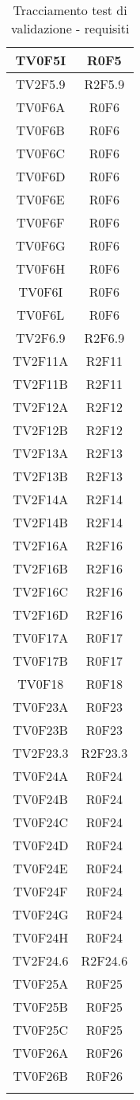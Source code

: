 \begin{longtable}{|c|c|}
	\hline
	TV0F5I & R0F5\\
	\hline
	TV2F5.9 & R2F5.9\\
	\hline
	TV0F6A & R0F6\\
	\hline
	TV0F6B & R0F6\\
	\hline
	TV0F6C & R0F6\\
	\hline
	TV0F6D & R0F6\\
	\hline
	TV0F6E & R0F6\\
	\hline
	TV0F6F & R0F6\\
	\hline
	TV0F6G & R0F6\\
	\hline
	TV0F6H & R0F6\\
	\hline
	TV0F6I & R0F6\\
	\hline
	TV0F6L & R0F6\\
	\hline
	TV2F6.9 & R2F6.9\\
	\hline
	TV2F11A & R2F11\\
	\hline
	TV2F11B & R2F11\\
	\hline
	TV2F12A & R2F12\\
	\hline
	TV2F12B & R2F12\\
	\hline
	TV2F13A & R2F13\\
	\hline
	TV2F13B & R2F13\\
	\hline
	TV2F14A & R2F14\\
	\hline
	TV2F14B & R2F14\\
	\hline
	TV2F16A & R2F16\\
	\hline
	TV2F16B & R2F16\\
	\hline
	TV2F16C & R2F16\\
	\hline
	TV2F16D & R2F16\\
	\hline
	TV0F17A & R0F17\\
	\hline
	TV0F17B & R0F17\\
	\hline
	TV0F18 & R0F18\\
	\hline
	TV0F23A & R0F23\\
	\hline
	TV0F23B & R0F23\\
	\hline
	TV2F23.3 & R2F23.3\\
	\hline
	TV0F24A & R0F24\\
	\hline
	TV0F24B & R0F24\\
	\hline
	TV0F24C & R0F24\\
	\hline
	TV0F24D & R0F24\\
	\hline
	TV0F24E & R0F24\\
	\hline
	TV0F24F & R0F24\\
	\hline
	TV0F24G & R0F24\\
	\hline
	TV0F24H & R0F24\\
	\hline
	TV2F24.6 & R2F24.6\\
	\hline
	TV0F25A & R0F25\\
	\hline
	TV0F25B & R0F25\\
	\hline
	TV0F25C & R0F25\\
	\hline
	TV0F26A & R0F26\\
	\hline
	TV0F26B & R0F26\\
	\hline
	\caption[Tracciamento test di validazione - requisiti]{Tracciamento test di validazione - requisiti}
\end{longtable}
\clearpage
	
